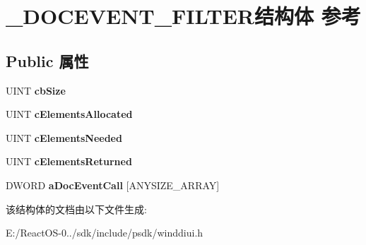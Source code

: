 \hypertarget{struct___d_o_c_e_v_e_n_t___f_i_l_t_e_r}{}\section{\+\_\+\+D\+O\+C\+E\+V\+E\+N\+T\+\_\+\+F\+I\+L\+T\+E\+R结构体 参考}
\label{struct___d_o_c_e_v_e_n_t___f_i_l_t_e_r}
\subsection*{Public 属性}
\begin{DoxyCompactItemize}
\item 
\mbox{\label{struct___d_o_c_e_v_e_n_t___f_i_l_t_e_r_adac0b18793dcb0aad8d8804446fc6b73}} 
U\+I\+NT {\bfseries cb\+Size}
\item 
\mbox{\label{struct___d_o_c_e_v_e_n_t___f_i_l_t_e_r_a4327ccc347a3774963bf08bf7a829923}} 
U\+I\+NT {\bfseries c\+Elements\+Allocated}
\item 
\mbox{\label{struct___d_o_c_e_v_e_n_t___f_i_l_t_e_r_a77f33b6c5362e171e4e04b3d5b7b96ca}} 
U\+I\+NT {\bfseries c\+Elements\+Needed}
\item 
\mbox{\label{struct___d_o_c_e_v_e_n_t___f_i_l_t_e_r_af82c7ab8b9ff635ceddb5f0abcfd86f4}} 
U\+I\+NT {\bfseries c\+Elements\+Returned}
\item 
\mbox{\label{struct___d_o_c_e_v_e_n_t___f_i_l_t_e_r_a23c40f9bbac81a95955166013f027d2d}} 
D\+W\+O\+RD {\bfseries a\+Doc\+Event\+Call} \mbox{[}A\+N\+Y\+S\+I\+Z\+E\+\_\+\+A\+R\+R\+AY\mbox{]}
\end{DoxyCompactItemize}


该结构体的文档由以下文件生成\+:\begin{DoxyCompactItemize}
\item 
E\+:/\+React\+O\+S-\/0../sdk/include/psdk/winddiui.\+h\end{DoxyCompactItemize}
